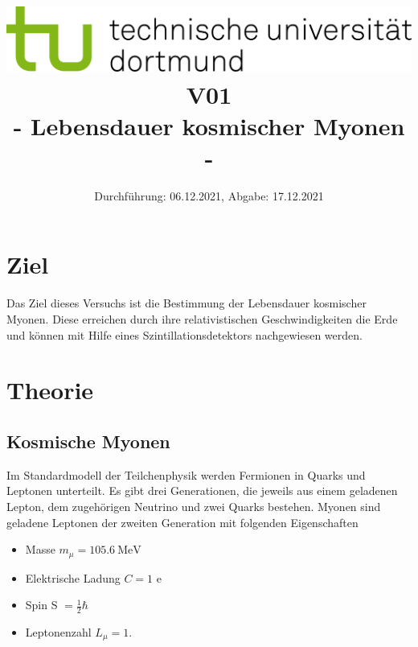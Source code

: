 
\usepackage{romannum}
\usepackage{listings}
\lstset{numbers=left, numberstyle=\tiny, numbersep=5pt}
\lstset{language=Perl}

\title{\includegraphics[scale=0.8]{../logo.jpg} \\ \vspace*{1cm} V01 \\ - Lebensdauer kosmischer Myonen -}

\date{Durchführung: 06.12.2021, Abgabe: 17.12.2021}


\setcounter{page}{1}

\maketitle

\tableofcontents
\newpage

\setcounter{page}{1}

\section{Ziel}
Das Ziel dieses Versuchs ist die Bestimmung der Lebensdauer kosmischer Myonen. Diese erreichen durch ihre relativistischen Geschwindigkeiten die Erde und können mit Hilfe eines Szintillationsdetektors nachgewiesen werden.

\section{Theorie}

\subsection{Kosmische Myonen}
Im Standardmodell der Teilchenphysik werden Fermionen in Quarks und Leptonen unterteilt. 
Es gibt drei Generationen, die jeweils aus einem geladenen Lepton, dem zugehörigen Neutrino und zwei Quarks bestehen. Myonen sind geladene Leptonen der zweiten Generation mit folgenden Eigenschaften
\begin{itemize}
    \item Masse $ m_{\mu} = \SI{105.6}{\mega\electronvolt}$
    \item Elektrische Ladung $C = 1$ e
    \item Spin S $= \frac{1}{2} \hbar$
    \item Leptonenzahl $L_{\mu} = 1$.
\end{itemize}

